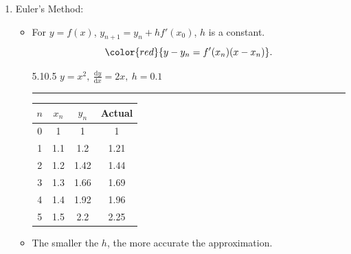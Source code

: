 \documentclass[12pt, a4paper]{article}
\def\d{{\mathrm{d}}}
\begin{document}
\begin{enumerate}
    \begin{example}{5.10.4}{}
        \textbf{Solve $\frac{\d y}{\d x}+3x^2y=6x^2$.}\\
        \noindent\rule[0.1pt]{\textwidth}{1pt}
        $$\because P(x)=3x^2,\ Q(x)=6x^2,$$
        $$\therefore I(x)=e^{\int P(x)\ \d x}=e^{\int 3x^2\ \d x}=e^{x^3}.$$
        $$\text{Multiply both sides by }I(x): $$
        $$\begin{aligned}
            e^{x^3}\frac{\d y}{\d x}+e^{x^3}\cdot 3x^2y&=e^{x^3}\cdot 6x^2\\
            \therefore \frac{\d}{\d x}\left(e^{x^3}y\right)&=e^{x^3}\cdot 6x^2\\
            \int \frac{\d}{\d x}\left(e^{x^3}y\right)\ \d x&=\int e^{x^3}\cdot 6x^2\ \d x\\
            {\color{green}{\left[\text{Let }x^3=u,\ \frac{\d u}{\d x}=2x^2,\ \d u=2x^2\ \d x\right.}}&{\color{green}{\left.\Rightarrow\ 2\int e^{u}\ \d u=2e^u+C=2e^{x^3}+C\right]}}\\
            e^{x^3}y&=2e^{x^3}+C\\
            y&=2+Ce^{-x^3}.
        \end{aligned}$$
    \end{example}
    \item Euler's Method: 
    \begin{itemize}
        \item For $y=f(x)$, $y_{n+1}=y_n+hf'(x_0)$, $h$ is a constant. $${\color{red}{y-y_n=f'(x_n)(x-x_n)}}.$$
        \begin{example}{5.10.5}{}
            \textbf{$y=x^2,\ \frac{\d y}{\d x}=2x,\ h=0.1$}\\
            \noindent\rule[0.1pt]{\textwidth}{1pt}
            \begin{center}\begin{tabular}{c|c|c|c}
                $n$&$x_n$&$y_n$&Actual\\
                \hline
                0&1&1&1\\
                1&1.1&1.2&1.21\\
                2&1.2&1.42&1.44\\
                3&1.3&1.66&1.69\\
                4&1.4&1.92&1.96\\
                5&1.5&2.2&2.25
            \end{tabular}\end{center}
        \end{example}
        \item The smaller the $h$, the more accurate the approximation. 

\end{itemize}
\end{enumerate}
\end{document}
